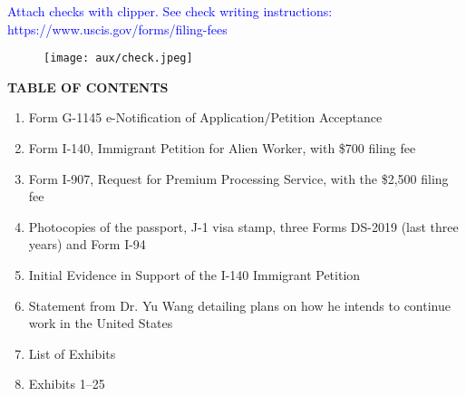 \documentclass[11pt]{article}
\title{}
\date{}
\begin{document}
\newcommand{\tc}[1]{\textcolor{blue}{#1}}



\tc{Attach checks with clipper. See check writing instructions: https://www.uscis.gov/forms/filing-fees}

\begin{figure}
\texttt{[image: aux/check.jpeg]}
\end{figure}

\vspace*{5em}



\begin{center}
\Large{\textbf{TABLE OF CONTENTS}} 
\end{center}



\begin{enumerate}
 \item Form G-1145 e-Notification of Application/Petition Acceptance
 \item Form I-140, Immigrant Petition for Alien Worker, with \$700 filing fee
 \item Form I-907, Request for Premium Processing Service, with the \$2,500 filing fee
 \item Photocopies of the passport, J-1 visa stamp, three Forms DS-2019 (last three years) and Form I-94
 \item Initial Evidence in Support of the I-140 Immigrant Petition
 \item Statement from Dr. Yu Wang detailing plans on how he intends to continue work in the United States
 \item List of Exhibits
 \item Exhibits 1--25
\end{enumerate}


\pagebreak



\sloppy


\vspace{4em}
\end{document}
